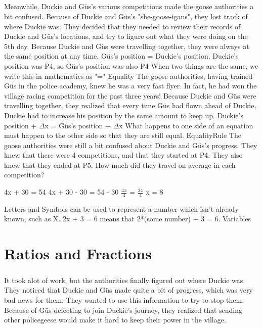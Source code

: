 \documentclass[a4paper,11pt ]{book}
\begin{document}
\paragraph{} Meanwhile, Duckie and Güs's various competitions made the goose authorities a bit confused. Because of Duckie and Güs's "she-goose-igans", they lost track of where Duckie was. They decided that they needed to review their records of Duckie and Güs's locations, and try to figure out what they were doing on the 5th day. 
\vfill
\pagebreak
{Because Duckie and Güs were travelling together, they were always at the same position at any time.}
{Güs's position = Duckie's position. Duckie's position was P4, so Güs's position was also P4}
{When two things are the same, we write this in mathematics as "="}
{Equality}
{The goose authorities, having trained Güs in the police academy, knew he was a very fast flyer. In fact, he had won the village racing competition for the past three years! Because Duckie and Güs were travelling together, they realized that every time Güs had flown ahead of Duckie, Duckie had to increase his position by the same amount to keep up.}
{Duckie's position + $\Delta$x = Güs's position + $\Delta$x}
{What happens to one side of an equation must happen to the other side so that they are still equal.}
{EqualityRule}
{The goose authorities were still a bit confused about Duckie and Güs's progress. They knew that there were 4 competitions, and that they started at P4. They also knew that they ended at P5. How much did they travel on average in each competition?}
{\begin{center} 4x + 30 = 54 \linebreak 4x + 30 - 30 = 54 - 30 \linebreak $\frac{4x}{4}$ = $\frac{24}{4}$ \linebreak x = $8$  \end{center}}
{Letters and Symbols can be used to represent a number which isn’t already known, such as X. 2x + 3 = 6 means that 2*(some number) + 3 = 6.}
{Variables}
\chapter{Ratios and Fractions}
\paragraph{} It took alot of work, but the authorities finally figured out where Duckie was. They noticed that Duckie and Güs made quite a bit of progress, which was very bad news for them. They wanted to use this information to try to stop them. Because of Güs defecting to join Duckie's journey, they realized that sending other policegeese would make it hard to keep their power in the village. 
\end{document}
